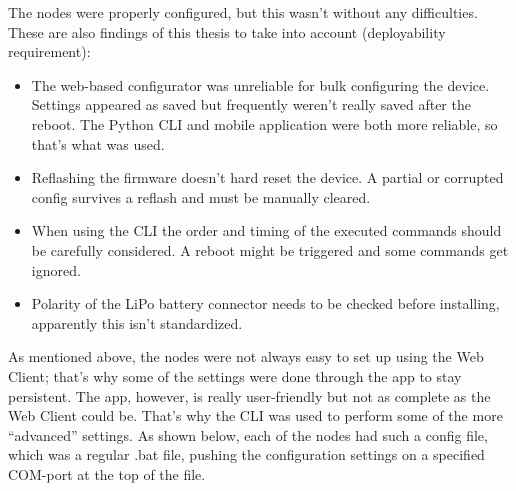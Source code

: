 The nodes were properly configured, but this wasn't without any difficulties.
These are also findings of this thesis to take into account (deployability requirement):
\begin{itemize}
    \item The web-based configurator was unreliable for bulk configuring the device. Settings appeared as saved but frequently weren't really saved after the reboot. The Python CLI and mobile application were both more reliable, so that's what was used.
    \item Reflashing the firmware doesn't hard reset the device. A partial or corrupted config survives a reflash and must be manually cleared.
    \item When using the CLI the order and timing of the executed commands should be carefully considered. A reboot might be triggered and some commands get ignored.
    \item Polarity of the LiPo battery connector needs to be checked before installing, apparently this isn't standardized.
\end{itemize}

As mentioned above, the nodes were not always easy to set up using the Web Client; that's why some of the settings were done through the app to stay persistent.
The app, however, is really user-friendly but not as complete as the Web Client could be. That's why the CLI was used to perform some of the more ``advanced'' settings.
As shown below, each of the nodes had such a config file, which was a regular .bat file, pushing the configuration settings on a specified COM-port at the top of the file.

